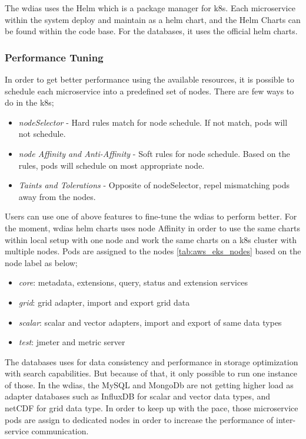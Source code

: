 The \acrshort{wdias} uses the Helm \cite{CNCFHelmDocs} which is a package manager for \acrshort{k8s}. Each microservice within the system deploy and maintain as a helm chart, and the Helm Charts \cite{KarunarathneWdias-helm-charts:Deployments} can be found within the code base. For the databases, it uses the official helm charts.

\subsubsection{Performance Tuning}
In order to get better performance using the available resources, it is possible to schedule each microservice into a predefined set of nodes. There are few ways to do in the \acrshort{k8s};
\begin{itemize}
    \item \emph{nodeSelector} - Hard rules match for node schedule. If not match, pods will not schedule.
    \item \emph{node Affinity and Anti-Affinity} - Soft rules for node schedule. Based on the rules, pods will schedule on most appropriate node.
    \item \emph{Taints and Tolerations} - Opposite of nodeSelector, repel mismatching pods away from the nodes.
\end{itemize}
Users can use one of above features to fine-tune the \acrshort{wdias} to perform better. For the moment, \acrshort{wdias} helm charts uses node Affinity in order to use the same charts within local setup with one node and work the same charts on a \acrshort{k8s} cluster with multiple nodes. Pods are assigned to the nodes \ref{tab:aws_eks_nodes} based on the node label as below;
\begin{itemize}
    \item \emph{core}: metadata, extensions, query, status and extension services
    \item \emph{grid}: grid adapter, import and export grid data
    \item \emph{scalar}: scalar and vector adapters, import and export of same data types
    \item \emph{test}: jmeter and metric server
\end{itemize}
The databases uses for data consistency and performance in storage optimization with search capabilities. But because of that, it only possible to run one instance of those. In the \acrshort{wdias}, the MySQL and MongoDb are not getting higher load as adapter databases such as InfluxDB for scalar and vector data types, and netCDF for grid data type. In order to keep up with the pace, those microservice pods are assign to dedicated nodes in order to increase the performance of inter-service communication.
